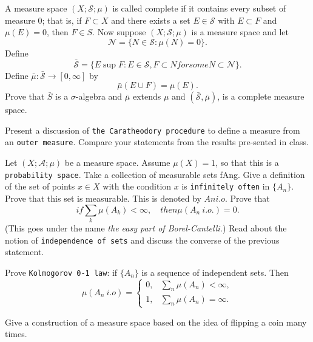 \documentclass[12pt]{article}
\newenvironment{exercise}[1]{\begin{tcolorbox}[colback=black!15, colframe=black!80, breakable, title=#1]}{\end{tcolorbox}}
\begin{document}
    \begin{exercise}{6}
        A measure space $(X; \mathscr{S}; \mu)$ is called complete if it contains every subset of measure $0$; that is, if $F \subset X$ and there exists a set $E \in \mathscr{S}$ with $E \subset F$ and $\mu(E) = 0$, then $F \in S$. Now suppose $(X; \mathscr{S}; \mu)$ is a measure space and let
        \[\mathscr{N}=\{N\in\mathscr{S}:\mu(N)=0\}. \]
        Define
        \[\bar{\mathscr{S}}=\{E\sup F: E\in\mathscr{S}, F\subset N for some N\subset \mathscr{N}\}. \]
        Define $\bar{\mu}: \bar{\mathscr{S}}\to[0,\infty]$ by
        \[\bar{\mu}(E\cup F)=\mu(E). \]
        Prove that $\bar{S}$ is a $\sigma$-algebra and $\bar{\mu}$ extends $\mu$ and $(\bar{\mathscr{S}}, \bar{\mu})$, is a complete measure space. 
    \end{exercise}

    \begin{exercise}{7}
        Present a discussion of \texttt{the Caratheodory procedure} to define a measure from an \texttt{outer measure}. Compare your statements from the results pre-sented in class. 
    \end{exercise}

    \begin{exercise}{8}
        Let $(X; \mathscr{A}; \mu)$ be a measure space. Assume $\mu(X) = 1$, so that this is a \texttt{probability space}. Take a collection of measurable sets fAng. Give a definition of the set of points $x \in X$ with the condition $x$ is \texttt{infinitely often} in $\{A_n\}$. Prove that this set is measurable. This is denoted by $An i.o.$ Prove that
        \[if \sum_k \mu(A_k)<\infty, \quad then \mu(A_n\ i.o.)=0. \]
        (This goes under the name \emph{the easy part of Borel-Cantelli.}) Read about the
        notion of \texttt{independence of sets} and discuss the converse of the previous
        statement.
    \end{exercise}

    \begin{exercise}{9}
        Prove \texttt{Kolmogorov 0-1 law}: if $\{A_n\}$ is a sequence of independent sets. Then
        \[
            \mu(A_n\ i.o)=\begin{cases}
                0, & \sum_{n}\mu(A_n)<\infty, \\
                1, & \sum_{n}\mu(A_n)=\infty. 
            \end{cases}
        \]
    \end{exercise}

    \begin{exercise}{10}
        Give a construction of a measure space based on the idea of flipping a coin many times. 
    \end{exercise}
\end{document}
